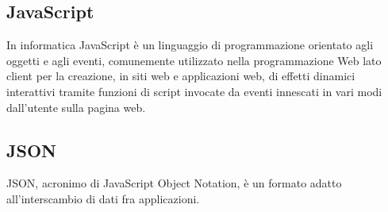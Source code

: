 
\subsection*{JavaScript}
In informatica JavaScript è un linguaggio di programmazione orientato agli oggetti e agli eventi, comunemente utilizzato nella programmazione Web lato client per la creazione, in siti web e applicazioni web, di effetti dinamici interattivi tramite funzioni di script invocate da eventi innescati in vari modi dall'utente sulla pagina web.

\subsection*{JSON}
JSON, acronimo di JavaScript Object Notation, è un formato adatto all'interscambio di dati fra applicazioni.

